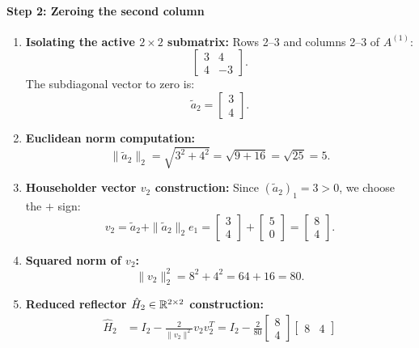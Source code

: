 \begin{example}
\paragraph{Step 2: Zeroing the second column}
\begin{enumerate}
    \item \textbf{Isolating the active $2 \times 2$ submatrix:}
    Rows 2--3 and columns 2--3 of $A^{(1)}$:
    \begin{equation}
        \begin{bmatrix} 3 & 4 \\ 4 & -3 \end{bmatrix}.
    \end{equation}
    The subdiagonal vector to zero is:
    \begin{equation}
        \tilde{a}_2 = \begin{bmatrix} 3 \\ 4 \end{bmatrix}.
    \end{equation}
    \item \textbf{Euclidean norm computation:}
    \begin{equation}
        \|\tilde{a}_2\|_2 = \sqrt{3^2 + 4^2} = \sqrt{9 + 16} = \sqrt{25} = 5.
    \end{equation}
    \item \textbf{Householder vector $v_2$ construction:}
    Since $(\tilde{a}_2)_1 = 3 > 0$, we choose the $+$ sign:
    \begin{equation}
        v_2 = \tilde{a}_2 + \|\tilde{a}_2\|_2 e_1 = \begin{bmatrix} 3 \\ 4 \end{bmatrix} + \begin{bmatrix} 5 \\ 0 \end{bmatrix} = \begin{bmatrix} 8 \\ 4 \end{bmatrix}.
    \end{equation}
    \item \textbf{Squared norm of $v_2$:}
    \begin{equation}
        \|v_2\|_2^2 = 8^2 + 4^2 = 64 + 16 = 80.
    \end{equation}
    \item \textbf{Reduced reflector $\hat{H}_2 \in \mathbb{R}^{2 \times 2}$ construction:}
    \begin{align}
        \hat{H}_2 &= I_2 - \frac{2}{\|v_2\|^2} v_2 v_2^T = I_2 - \frac{2}{80} \begin{bmatrix} 8 \\ 4 \end{bmatrix} \begin{bmatrix} 8 & 4 \end{bmatrix} \nonumber\\

\end{align}
\end{enumerate}
\end{example}
